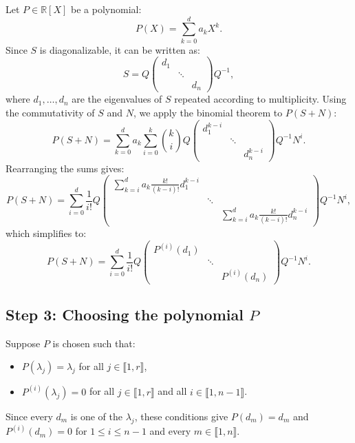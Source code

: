 \documentclass{article}
\begin{document}
Let \( P \in \mathbb{R}[X] \) be a polynomial:
\[
P(X) = \sum_{k=0}^d a_k X^k.
\]
Since \( S \) is diagonalizable, it can be written as:
\[
S = Q 
\begin{pmatrix}
d_1 & & \\
& \ddots & \\
& & d_n
\end{pmatrix}
Q^{-1},
\]
where \( d_1, \dots, d_n \) are the eigenvalues of \( S \) repeated according to
multiplicity.
Using the commutativity of \( S \) and \( N \), we apply the binomial theorem to \( P(S + N) \):
\[
P(S + N) = \sum_{k=0}^d a_k \sum_{i=0}^k \binom{k}{i} Q 
\begin{pmatrix}
d_1^{k-i} & & \\
& \ddots & \\
& & d_n^{k-i}
\end{pmatrix}
Q^{-1} N^i.
\]
Rearranging the sums gives:
\[
P(S + N) = \sum_{i=0}^d \frac{1}{i!} Q 
\begin{pmatrix}
\sum_{k=i}^d a_k \frac{k!}{(k-i)!} d_1^{k-i} & & \\
& \ddots & \\
& & \sum_{k=i}^d a_k \frac{k!}{(k-i)!} d_n^{k-i}
\end{pmatrix}
Q^{-1} N^i,
\]
which simplifies to:
\[
P(S + N) = \sum_{i=0}^d \frac{1}{i!} Q 
\begin{pmatrix}
P^{(i)}(d_1) & & \\
& \ddots & \\
& & P^{(i)}(d_n)
\end{pmatrix}
Q^{-1} N^i.
\]

\subsection{Step 3: Choosing the polynomial \( P \)}

Suppose \( P \) is chosen such that:
\begin{itemize}
    \item \( P(\lambda_j) = \lambda_j \) for all \( j \in \llbracket 1, r \rrbracket \),
    \item \( P^{(i)}(\lambda_j) = 0 \) for all \( j \in \llbracket 1, r \rrbracket \) and all \( i \in \llbracket 1, n-1 \rrbracket \).
\end{itemize}
Since every \( d_m \) is one of the \( \lambda_j \), these conditions give
\( P(d_m) = d_m \) and \( P^{(i)}(d_m) = 0 \) for \( 1 \le i \le n-1 \) and every
\( m \in \llbracket 1, n \rrbracket \).
\end{document}
